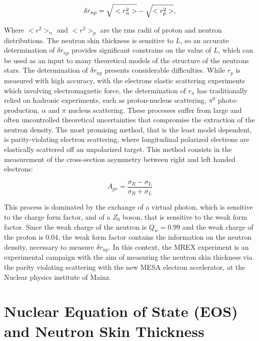 \begin{equation} \label{eq:NeutronSkin}
\delta r_{np} = \sqrt{\vphantom{r^{2}_{p}}<r^{2}_{n}>} - \sqrt{<r^{2}_{p}>} ,
\end{equation}

Where $<r^{2}>_{n}$ and $<r^{2}>_{p}$ are the rms radii of proton and neutron distributions. The neutron skin thickness is sensitive to $L$, so an accurate determination of $\delta r_{np}$ provides significant constrains on the value of $L$, which can be used as an input to many theoretical models of the structure of the neutrons stars.
The determination of $\delta r_{np}$ presents considerable difficulties. While $r_{p}$ is measured with high accuracy, with the electrons elastic scattering experiments which involving electromagnetic force, the determination of $r_{n}$ has traditionally relied on hadronic experiments, such as proton-nucleus scattering, $\pi^{0}$ photo-production, $\alpha$ and $\pi$ nucleus scattering. These processes suffer from large and often uncontrolled theoretical uncertainties that compromise the extraction of the neutron density. The most promising method, that is the least model dependent, is parity-violating electron scattering, where longitudinal polarized electrons are elastically scattered off an unpolarized target. This method consists in the measurement of the cross-section asymmetry between right and left handed electrons:

\begin{equation}
A_{pv} = \dfrac{\sigma_{R} - \sigma_{L}}{\sigma_{R} + \sigma_{L}}
\end{equation}

This process is dominated by the exchange of a virtual photon, which is sensitive to the charge form factor, and of a $Z_{0}$ boson, that is sensitive to the weak form factor. Since the weak charge of the neutron is $Q_{w} = 0.99$ and the weak charge of the proton is $0.04$, the weak form factor contains the information on the neutron density, necessary to measure $\delta r_{np}$. In this context, the MREX experiment is an experimental campaign with the aim of measuring the neutron skin thickness via the parity violating scattering with the new MESA electron accelerator, at the Nuclear physics institute of Mainz.

\section{Nuclear Equation of State (EOS) and Neutron Skin Thickness}

